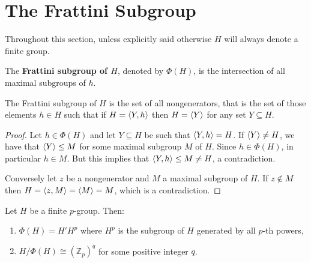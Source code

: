 \section{The Frattini Subgroup}

Throughout this section, unless explicitly said otherwise $H$ will always denote a finite group. 

\begin{definition}
    The \textbf{Frattini subgroup of $H$}, denoted by \textbf{$\Phi(H)$}, is the intersection of all maximal subgroups of $h$. 
\end{definition}

\begin{theorem}
    \cite[p.~123]{RotmanITG}
    The Frattini subgroup of $H$ is the set of all nongenerators, that is the set of those elements $h \in H$ such that if $H = \langle Y, h \rangle$ then $H = \langle Y \rangle$ for any set $Y \subseteq H$.
\end{theorem}

\begin{proof}
    Let $h \in \Phi(H)$ and let $Y \subseteq H$ be such that $\langle Y, h \rangle = H$. If $\langle Y \rangle \ne H$, we have that $\langle Y \rangle \le M$ for some maximal subgroup $M$ of $H$. Since $h \in \Phi(H)$, in particular $h \in M$.  But this implies that $\langle Y,h \rangle \le M \ne H$, a contradiction.

    Conversely let $z$ be a nongenerator and $M$ a maximal subgroup of $H$. If $z \notin M$ then $H = \langle z, M \rangle = \langle M \rangle = M$, which is a contradiction.
\end{proof}

\begin{theorem}
    \cite[p.~127]{RotmanITG}
    \label{fratpgroup}
    Let $H$ be a finite $p$-group. Then:
    \begin{enumerate}
        \item $\Phi(H) = H'H^p$ where $H^p$ is the subgroup of $H$ generated by all $p$-th powers,
        \item $H/\Phi(H) \cong (\mathbb{Z}_p)^q$ for some positive integer $q$.
    \end{enumerate}
\end{theorem}

